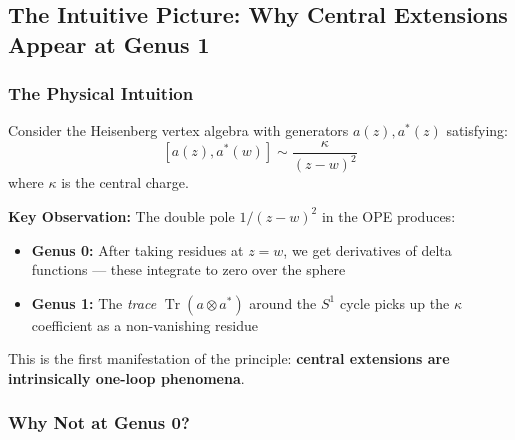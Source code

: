 \subsection{The Intuitive Picture: Why Central Extensions Appear at Genus 1}

\subsubsection{The Physical Intuition}

Consider the Heisenberg vertex algebra with generators $a(z), a^*(z)$ satisfying:
$$[a(z), a^*(w)] \sim \frac{\kappa}{(z-w)^2}$$
where $\kappa$ is the central charge.

\begin{center}
\quad\quad
{}
\end{center}

\textbf{Key Observation:} The double pole $1/(z-w)^2$ in the OPE produces:
\begin{itemize}
\item \textbf{Genus 0:} After taking residues at $z=w$, we get derivatives of
delta functions --- these integrate to zero over the sphere
\item \textbf{Genus 1:} The \emph{trace} $\operatorname{Tr}(a \otimes a^*)$ around
the $S^1$ cycle picks up the $\kappa$ coefficient as a non-vanishing residue
\end{itemize}

This is the first manifestation of the principle: \textbf{central extensions are
intrinsically one-loop phenomena}.

\subsubsection{Why Not at Genus 0?}


